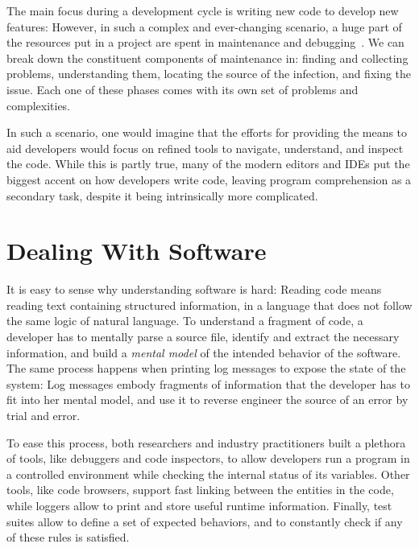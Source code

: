 The main focus during a development cycle is writing new code to develop new features: However, in such a complex and ever-changing scenario, a huge part of the resources put in a project are spent in maintenance and debugging~\cite{Corb1989,Fjel1983,Zelk1979,Mine2015b}.
We can break down the constituent components of maintenance in: finding and collecting problems, understanding them, locating the source of the infection, and fixing the issue.
Each one of these phases comes with its own set of problems and complexities.

In such a scenario, one would imagine that the efforts for providing the means to aid developers would focus on refined tools to navigate, understand, and inspect the code.
While this is partly true, many of the modern editors and IDEs put the biggest accent on how developers write code, leaving program comprehension as a secondary task, despite it being intrinsically more complicated.


\section{Dealing With Software}

It is easy to sense why understanding software is hard: Reading code means reading text containing structured information, in a language that does not follow the same logic of natural language.
To understand a fragment of code, a developer has to mentally parse a source file, identify and extract the necessary information, and build a \emph{mental model} of the intended behavior of the software.
The same process happens when printing log messages to expose the state of the system: Log messages embody fragments of information that the developer has to fit into her mental model, and use it to reverse engineer the source of an error by trial and error.

To ease this process, both researchers and industry practitioners built a plethora of tools, like debuggers and code inspectors, to allow developers run a program in a controlled environment while checking the internal status of its variables.
Other tools, like code browsers, support fast linking between the entities in the code, while loggers allow to print and store useful runtime information.
Finally, test suites allow to define a set of expected behaviors, and to constantly check if any of these rules is satisfied.


